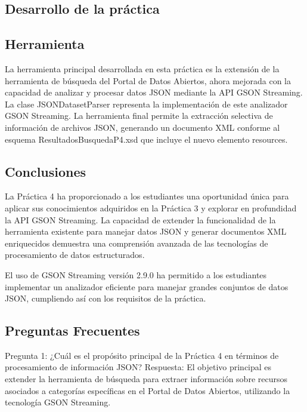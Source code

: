 \subsection{Desarrollo de la práctica}



\subsection{Herramienta}

\noindent La herramienta principal desarrollada en esta práctica es la extensión de la herramienta de búsqueda del Portal de Datos Abiertos, ahora mejorada con la capacidad de analizar y procesar datos JSON mediante la API GSON Streaming. La clase JSONDatasetParser representa la implementación de este analizador GSON Streaming. La herramienta final permite la extracción selectiva de información de archivos JSON, generando un documento XML conforme al esquema ResultadosBusquedaP4.xsd que incluye el nuevo elemento resources.

\subsection{Conclusiones}

\noindent La Práctica 4 ha proporcionado a los estudiantes una oportunidad única para aplicar sus conocimientos adquiridos en la Práctica 3 y explorar en profundidad la API GSON Streaming. La capacidad de extender la funcionalidad de la herramienta existente para manejar datos JSON y generar documentos XML enriquecidos demuestra una comprensión avanzada de las tecnologías de procesamiento de datos estructurados.

El uso de GSON Streaming versión 2.9.0 ha permitido a los estudiantes implementar un analizador eficiente para manejar grandes conjuntos de datos JSON, cumpliendo así con los requisitos de la práctica.

\subsection{Preguntas Frecuentes}

\noindent Pregunta 1: ¿Cuál es el propósito principal de la Práctica 4 en términos de procesamiento de información JSON?
Respuesta: El objetivo principal es extender la herramienta de búsqueda para extraer información sobre recursos asociados a categorías específicas en el Portal de Datos Abiertos, utilizando la tecnología GSON Streaming.


